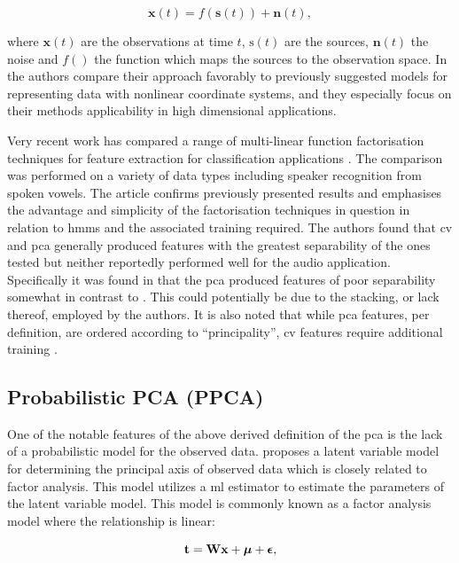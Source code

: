 \begin{equation}\label{eq:nonlinear}
\textbf{x}(t) = f\left(\textbf{s}(t)\right) + \textbf{n}\left(t\right),
\end{equation}

where $\textbf{x}(t)$ are the observations at time $t$, $\text{s}(t)$ are the sources, $\textbf{n}(t)$ the noise and $f()$ the function which maps the sources to the observation space. In \cite{Lappalainen2000} the authors compare their approach favorably to previously suggested models for representing data with nonlinear coordinate systems, and they especially focus on their methods applicability in high dimensional applications.

Very recent work has compared a range of multi-linear function factorisation techniques for feature extraction for classification applications \cite{Burke2013}. The comparison was performed on a variety of data types including speaker recognition from spoken vowels. The article confirms previously presented results and emphasises the advantage and simplicity of the factorisation techniques in question in relation to \gls{hmm}s and the associated training required. The authors found that \gls{cv} and \gls{pca} generally produced features with the greatest separability of the ones tested but neither reportedly performed well for the audio application. Specifically it was found in \cite{Burke2013} that the \gls{pca} produced features of poor separability somewhat in contrast to \cite{Raychaudhuri2000}. This could potentially be due to the stacking, or lack thereof, employed by the authors. It is also noted that while \gls{pca} features, per definition, are ordered according to ``principality'', \gls{cv} features require additional training \cite{Burke2013}.

\subsection{Probabilistic PCA (PPCA)}
One of the notable features of the above derived definition of the \gls{pca} is the lack of a probabilistic model for the observed data. \cite{Tipping1999} proposes a latent variable model for determining the principal axis of observed data which is closely related to factor analysis. This model utilizes a \gls{ml} estimator to estimate the parameters of the latent variable model. This model is commonly known as a factor analysis model where the relationship is linear:

\begin{equation}\label{eq:facAn}
\textrm{\textbf{t}} = \textrm{\textbf{W}}\textrm{\textbf{x}} + \boldsymbol\mu + \boldsymbol\epsilon,
\end{equation}

